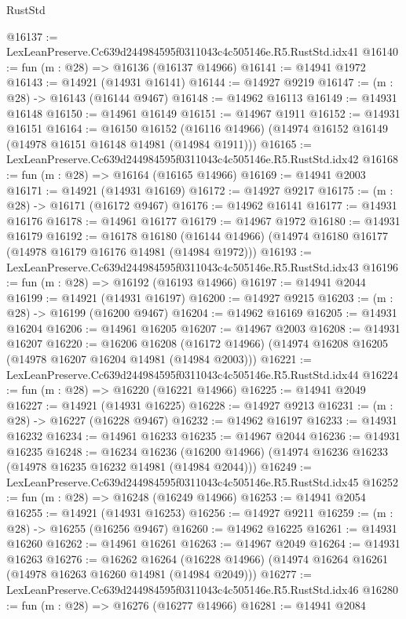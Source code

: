 \begin{lexlean}{RustStd}
\begin{coremodule}
@16137 := LexLeanPreserve.Cc639d244984595f0311043c4c505146e.R5.RustStd.idx41
@16140 := fun (m : @28) => @16136 (@16137 @14966)
@16141 := @14941 @1972
@16143 := @14921 (@14931 @16141)
@16144 := @14927 @9219
@16147 := (m : @28) -> @16143 (@16144 @9467)
@16148 := @14962 @16113
@16149 := @14931 @16148
@16150 := @14961 @16149
@16151 := @14967 @1911
@16152 := @14931 @16151
@16164 := @16150
    @16152
    (@16116 @14966)
    (@14974 @16152 @16149 (@14978 @16151 @16148 @14981 (@14984 @1911)))
@16165 := LexLeanPreserve.Cc639d244984595f0311043c4c505146e.R5.RustStd.idx42
@16168 := fun (m : @28) => @16164 (@16165 @14966)
@16169 := @14941 @2003
@16171 := @14921 (@14931 @16169)
@16172 := @14927 @9217
@16175 := (m : @28) -> @16171 (@16172 @9467)
@16176 := @14962 @16141
@16177 := @14931 @16176
@16178 := @14961 @16177
@16179 := @14967 @1972
@16180 := @14931 @16179
@16192 := @16178
    @16180
    (@16144 @14966)
    (@14974 @16180 @16177 (@14978 @16179 @16176 @14981 (@14984 @1972)))
@16193 := LexLeanPreserve.Cc639d244984595f0311043c4c505146e.R5.RustStd.idx43
@16196 := fun (m : @28) => @16192 (@16193 @14966)
@16197 := @14941 @2044
@16199 := @14921 (@14931 @16197)
@16200 := @14927 @9215
@16203 := (m : @28) -> @16199 (@16200 @9467)
@16204 := @14962 @16169
@16205 := @14931 @16204
@16206 := @14961 @16205
@16207 := @14967 @2003
@16208 := @14931 @16207
@16220 := @16206
    @16208
    (@16172 @14966)
    (@14974 @16208 @16205 (@14978 @16207 @16204 @14981 (@14984 @2003)))
@16221 := LexLeanPreserve.Cc639d244984595f0311043c4c505146e.R5.RustStd.idx44
@16224 := fun (m : @28) => @16220 (@16221 @14966)
@16225 := @14941 @2049
@16227 := @14921 (@14931 @16225)
@16228 := @14927 @9213
@16231 := (m : @28) -> @16227 (@16228 @9467)
@16232 := @14962 @16197
@16233 := @14931 @16232
@16234 := @14961 @16233
@16235 := @14967 @2044
@16236 := @14931 @16235
@16248 := @16234
    @16236
    (@16200 @14966)
    (@14974 @16236 @16233 (@14978 @16235 @16232 @14981 (@14984 @2044)))
@16249 := LexLeanPreserve.Cc639d244984595f0311043c4c505146e.R5.RustStd.idx45
@16252 := fun (m : @28) => @16248 (@16249 @14966)
@16253 := @14941 @2054
@16255 := @14921 (@14931 @16253)
@16256 := @14927 @9211
@16259 := (m : @28) -> @16255 (@16256 @9467)
@16260 := @14962 @16225
@16261 := @14931 @16260
@16262 := @14961 @16261
@16263 := @14967 @2049
@16264 := @14931 @16263
@16276 := @16262
    @16264
    (@16228 @14966)
    (@14974 @16264 @16261 (@14978 @16263 @16260 @14981 (@14984 @2049)))
@16277 := LexLeanPreserve.Cc639d244984595f0311043c4c505146e.R5.RustStd.idx46
@16280 := fun (m : @28) => @16276 (@16277 @14966)
@16281 := @14941 @2084

\end{coremodule}
\end{lexlean}

